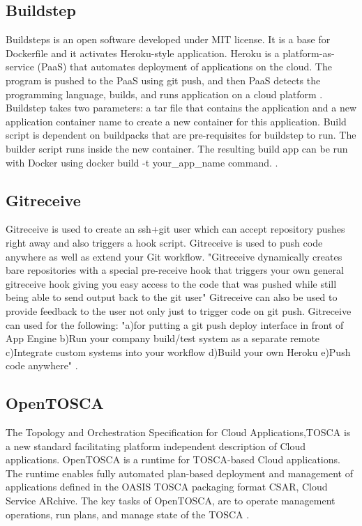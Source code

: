 \subsection{Buildstep}
     
     Buildsteps is an open software developed under MIT license. 
     It is a base for Dockerfile and it activates Heroku-style 
     application. Heroku is a platform-as-service (PaaS) that 
     automates deployment of applications on the cloud. The 
     program is pushed to the PaaS using git push, and then 
     PaaS detects the programming language, builds, and runs 
     application on a cloud platform \cite{plassnig15}.
     Buildstep takes two parameters: a tar file that contains 
     the application and a new application container name to 
     create a new container for this application. Build script 
     is dependent on buildpacks that are pre-requisites for 
     buildstep to run. The builder script runs inside the new 
     container.  The resulting build app can be run with Docker 
     using docker build -t your\_app\_name command.
     \cite{github-buildstep}. 

\subsection{Gitreceive}

     Gitreceive is used to create an ssh+git user which can accept
     repository pushes right away and also triggers a hook
     script. Gitreceive is used to push code anywhere as well as
     extend your Git workflow. "Gitreceive dynamically creates bare
     repositories with a special pre-receive hook that triggers your
     own general gitreceive hook giving you easy access to the code
     that was pushed while still being able to send output back to the
     git user" Gitreceive can also be used to provide feedback to the
     user not only just to trigger code on git push.  Gitreceive can
     used for the following: "a)for putting a git push deploy
     interface in front of App Engine b)Run your company build/test
     system as a separate remote c)Integrate custom systems into your
     workflow d)Build your own Heroku e)Push code
     anywhere" \cite{lindsay2016}.
     
\subsection{OpenTOSCA}

     The Topology and Orchestration Specification for Cloud
     Applications,TOSCA is a new standard facilitating platform
     independent description of Cloud applications. OpenTOSCA is a
     runtime for TOSCA-based Cloud applications. The runtime enables
     fully automated plan-based deployment and management of
     applications defined in the OASIS TOSCA packaging format CSAR,
     Cloud Service ARchive.  The key tasks of OpenTOSCA, are to
     operate management operations, run plans, and manage state of the
     TOSCA \cite{openTOSCA-paper}.
     
